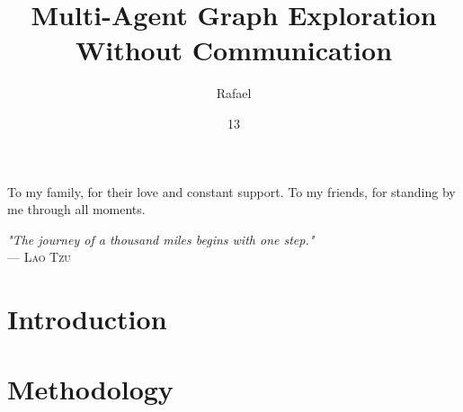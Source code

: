 \documentclass[tg, eng]{ita}    %
\author{Rafael}{Studart Mattos Di Piero}
\title{Multi-Agent Graph Exploration Without Communication}
\date{13}{Nov}{2024}
\begin{document}
\maketitle

\begin{itadedication}
  To my family, for their love and constant support. 
  To my friends, for standing by me through all moments. 
\end{itadedication}

\begin{itathanks}

\end{itathanks}


\thispagestyle{empty}
\ifhyperref{}\fi
\begin{flushright}
\begin{spacing}{1}
\mbox{}\vfill
{\sffamily\itshape
"The journey of a thousand miles begins with one step."\\
}
--- \textsc{
Lao Tzu
}
\end{spacing}
\end{flushright}

\begin{abstract}
\noindent

\end{abstract}

\begin{englishabstract}
\noindent

\end{englishabstract}

\listoffigures %


\listofalgorithms %

\listofabbreviations

\listofsymbols

\tableofcontents

\mainmatter

\chapter{Introduction}


\chapter{Methodology}

\end{document}
